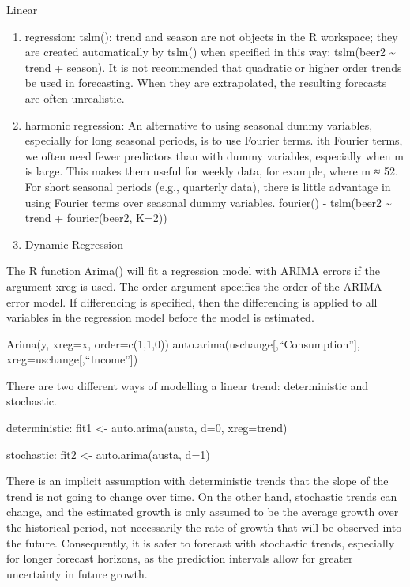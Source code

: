 \documentclass[]{book}
\begin{document}
Linear

\begin{enumerate}
\def\labelenumi{\arabic{enumi}.}
\setcounter{enumi}{9}
\item
  regression: tslm(): trend and season are not objects in the R
  workspace; they are created automatically by tslm() when specified in
  this way: tslm(beer2 \textasciitilde{} trend + season). It is not
  recommended that quadratic or higher order trends be used in
  forecasting. When they are extrapolated, the resulting forecasts are
  often unrealistic.
\item
  harmonic regression: An alternative to using seasonal dummy variables,
  especially for long seasonal periods, is to use Fourier terms. ith
  Fourier terms, we often need fewer predictors than with dummy
  variables, especially when m is large. This makes them useful for
  weekly data, for example, where m ≈ 52. For short seasonal periods
  (e.g., quarterly data), there is little advantage in using Fourier
  terms over seasonal dummy variables. fourier() - tslm(beer2
  \textasciitilde{} trend + fourier(beer2, K=2))
\item
  Dynamic Regression
\end{enumerate}

The R function Arima() will fit a regression model with ARIMA errors if
the argument xreg is used. The order argument specifies the order of the
ARIMA error model. If differencing is specified, then the differencing
is applied to all variables in the regression model before the model is
estimated.

Arima(y, xreg=x, order=c(1,1,0))
auto.arima(uschange{[},``Consumption''{]},
xreg=uschange{[},``Income''{]})

There are two different ways of modelling a linear trend: deterministic
and stochastic.

deterministic: fit1 \textless{}- auto.arima(austa, d=0, xreg=trend)

stochastic: fit2 \textless{}- auto.arima(austa, d=1)

There is an implicit assumption with deterministic trends that the slope
of the trend is not going to change over time. On the other hand,
stochastic trends can change, and the estimated growth is only assumed
to be the average growth over the historical period, not necessarily the
rate of growth that will be observed into the future. Consequently, it
is safer to forecast with stochastic trends, especially for longer
forecast horizons, as the prediction intervals allow for greater
uncertainty in future growth.
\end{document}
